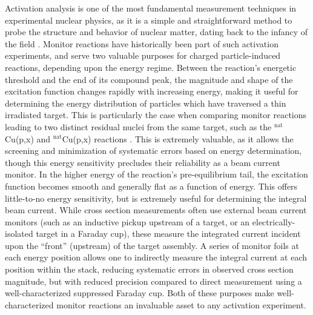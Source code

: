 \documentclass[%
 reprint,
superscriptaddress,
onecolumn,
linenumbers,
notitlepage,
 amsmath,amssymb,
 aps,
prc,
]{revtex4-1}
\newcommand{\comment}[1]{\todo[color=blue!20!white,inline]{ASV: #1}}
\begin{document}
Activation analysis is one of the most fundamental measurement techniques in experimental nuclear physics, as it is a simple and straightforward method to probe the structure and behavior of nuclear matter,  dating back to the infancy of the field \cite{ehmann1993radiochemistry,krüger1971principles}. 
Monitor reactions have  historically been part of such activation experiments, and serve two valuable purposes for charged particle-induced reactions, depending upon the energy regime.  
Between the reaction's energetic threshold  and the end of its compound peak, the magnitude and shape of the excitation function changes rapidly with increasing energy, making it useful for determining the energy distribution of particles which have traversed a thin irradiated target.
This is particularly the case when comparing  monitor reactions leading to two distinct residual nuclei from the same target, such as the $^\text{nat}$Cu(p,x) and $^\text{nat}$Cu(p,x) reactions \cite{gul2001charged}.
This is extremely valuable, as it allows the screening and minimization of systematic errors based on energy determination, though this energy sensitivity  precludes their reliability as a beam current monitor.  
In the higher energy  of the reaction's pre-equilibrium tail, the excitation function becomes  smooth and generally flat as a function of energy.
This  offers little-to-no energy sensitivity, but  is extremely useful for determining the integral beam current. 
While cross section measurements often use external beam current monitors (such as an inductive pickup upstream of a target, or an electrically-isolated target in a Faraday cup), these measure the integrated current incident upon the \enquote{front} (upstream) of the target assembly.
A series of monitor foils at each energy position allows one to indirectly measure the integral current at each position within the stack, reducing systematic errors in observed cross section magnitude, but with reduced precision compared to direct measurement using a well-characterized suppressed Faraday cup.
Both of these purposes make well-characterized monitor reactions an invaluable asset to any activation experiment. 
\end{document}
